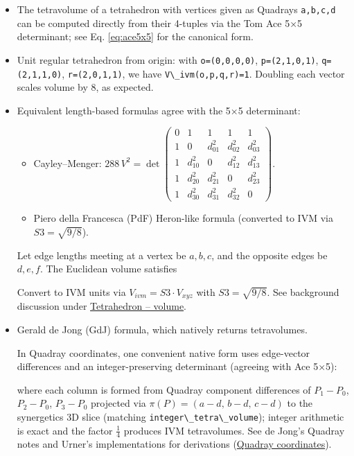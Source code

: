 \documentclass[
  10pt,
]{article}
\newcommand{\passthrough}[1]{#1}
\providecommand{\tightlist}{%
  \setlength{\itemsep}{0pt}\setlength{\parskip}{0pt}}
\begin{document}
\begin{itemize}
\item
  The tetravolume of a tetrahedron with vertices given as Quadrays
  \passthrough{\lstinline!a,b,c,d!} can be computed directly from their
  4-tuples via the Tom Ace 5×5 determinant; see Eq. \eqref{eq:ace5x5}
  for the canonical form.
\item
  Unit regular tetrahedron from origin: with
  \passthrough{\lstinline!o=(0,0,0,0)!},
  \passthrough{\lstinline!p=(2,1,0,1)!},
  \passthrough{\lstinline!q=(2,1,1,0)!},
  \passthrough{\lstinline!r=(2,0,1,1)!}, we have
  \passthrough{\lstinline!V\_ivm(o,p,q,r)=1!}. Doubling each vector
  scales volume by 8, as expected.
\item
  Equivalent length-based formulas agree with the 5×5 determinant:

  \begin{itemize}
  \tightlist
  \item
    Cayley--Menger:
    \(288\,V^2 = \det\begin{pmatrix}0&1&1&1&1\\1&0&d_{01}^2&d_{02}^2&d_{03}^2\\1&d_{10}^2&0&d_{12}^2&d_{13}^2\\1&d_{20}^2&d_{21}^2&0&d_{23}^2\\1&d_{30}^2&d_{31}^2&d_{32}^2&0\end{pmatrix}\).
  \item
    Piero della Francesca (PdF) Heron-like formula (converted to IVM via
    \(S3 = \sqrt{9/8}\)).
  \end{itemize}

  Let edge lengths meeting at a vertex be \(a,b,c\), and the opposite
  edges be \(d,e,f\). The Euclidean volume satisfies

  Convert to IVM units via \(V_{ivm} = S3 \cdot V_{xyz}\) with
  \(S3=\sqrt{9/8}\). See background discussion under
  \href{https://en.wikipedia.org/wiki/Tetrahedron\#Volume}{Tetrahedron
  -- volume}.
\item
  Gerald de Jong (GdJ) formula, which natively returns tetravolumes.

  In Quadray coordinates, one convenient native form uses edge-vector
  differences and an integer-preserving determinant (agreeing with Ace
  5×5):

  where each column is formed from Quadray component differences of
  \(P_1-P_0\), \(P_2-P_0\), \(P_3-P_0\) projected via
  \(\pi(P) = (a - d,\, b - d,\, c - d)\) to the synergetics 3D slice
  (matching \passthrough{\lstinline!integer\_tetra\_volume!}); integer
  arithmetic is exact and the factor \(\tfrac{1}{4}\) produces IVM
  tetravolumes. See de Jong's Quadray notes and Urner's implementations
  for derivations
  (\href{https://en.wikipedia.org/wiki/Quadray_coordinates}{Quadray
  coordinates}).
\end{itemize}
\end{document}
